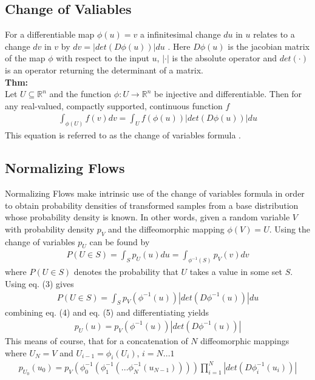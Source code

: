 \documentclass{article}
\begin{document}
\subsection{Change of Valiables}
For a differentiable map $\phi(u)=v$ a infinitesimal change $du$ in $u$ relates to a change $dv$ in $v$ by $d v = |det(D\phi(u))| d u$ . Here $D\phi(u)$ is the jacobian matrix of the map $\phi$ with respect to the input $u$, $|\cdot|$ is the absolute operator and $det(\cdot)$ is an operator returning the determinant of a matrix.\\
\textbf{Thm:}\\
Let $U\subseteq \mathbb{R}^n$ and the function $\phi : U \rightarrow \mathbb{R}^n$ be injective and differentiable. Then for any real-valued, compactly supported, continuous function $f$
\begin{align}
	\int_{\phi(U)} f(v)dv = \int_U f(\phi(u)) |det(D\phi(u))| du
\end{align}
This equation is referred to as the change of variables formula \cite{wiki:vc}.

\subsection{Normalizing Flows}
Normalizing Flows make intrinsic use of the change of variables formula in order to obtain probability densities of transformed samples from a base distribution whose probability density is known. In other words, given a random variable $V$ with probability density $p_V$ and the diffeomorphic mapping $\phi(V)=U$. Using the change of variables $p_U$ can be found by
\begin{align}
	P(U\in S) = \int_S p_U(u)du = \int_{\phi^{-1}(S)} p_V(v)dv 
\end{align}
where $P(U\in S)$ denotes the probability that $U$ takes a value in some set $S$.
Using eq. (3) gives
\begin{align}
	P(U\in S) = \int_S p_V(\phi^{-1}(u))|det(D\phi^{-1}(u))|du
\end{align}
combining eq. (4) and eq. (5) and differentiating yields
\begin{align}
p_U(u) = p_V(\phi^{-1}(u))|det(D\phi^{-1}(u))|
\end{align}
This means of course, that for a concatenation of $N$ diffeomorphic mappings where $U_N=V$ and $U_{i-1} = \phi_i(U_i)$, $i = N...1$
\begin{align}
p_{U_0}(u_0) = p_V(\phi_0^{-1}(\phi_1^{-1}(...\phi_N^{-1}(u_{N-1}))))\prod_{i=1}^{N}|det(D\phi_i^{-1}(u_i))|
\end{align}
\end{document}

